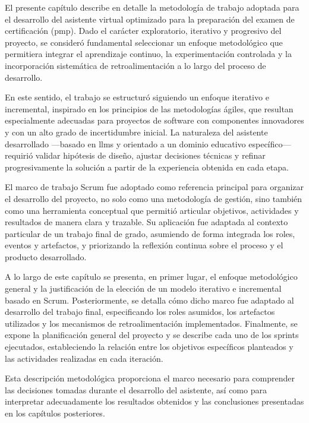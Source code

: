 El presente capítulo describe en detalle la metodología de trabajo adoptada para el desarrollo del asistente virtual optimizado para la preparación del examen de certificación (\gls{pmp}). Dado el carácter exploratorio, iterativo y progresivo del proyecto, se consideró fundamental seleccionar un enfoque metodológico que permitiera integrar el aprendizaje continuo, la experimentación controlada y la incorporación sistemática de retroalimentación a lo largo del proceso de desarrollo.

En este sentido, el trabajo se estructuró siguiendo un enfoque iterativo e incremental, inspirado en los principios de las metodologías ágiles, que resultan especialmente adecuadas para proyectos de software con componentes innovadores y con un alto grado de incertidumbre inicial. La naturaleza del asistente desarrollado —basado en \glspl{llm} y orientado a un dominio educativo específico— requirió validar hipótesis de diseño, ajustar decisiones técnicas y refinar progresivamente la solución a partir de la experiencia obtenida en cada etapa.

El marco de trabajo Scrum fue adoptado como referencia principal para organizar el desarrollo del proyecto, no solo como una metodología de gestión, sino también como una herramienta conceptual que permitió articular objetivos, actividades y resultados de manera clara y trazable. Su aplicación fue adaptada al contexto particular de un trabajo final de grado, asumiendo de forma integrada los roles, eventos y artefactos, y priorizando la reflexión continua sobre el proceso y el producto desarrollado.

A lo largo de este capítulo se presenta, en primer lugar, el enfoque metodológico general y la justificación de la elección de un modelo iterativo e incremental basado en Scrum. Posteriormente, se detalla cómo dicho marco fue adaptado al desarrollo del trabajo final, especificando los roles asumidos, los artefactos utilizados y los mecanismos de retroalimentación implementados. Finalmente, se expone la planificación general del proyecto y se describe cada uno de los sprints ejecutados, estableciendo la relación entre los objetivos específicos planteados y las actividades realizadas en cada iteración.

Esta descripción metodológica proporciona el marco necesario para comprender las decisiones tomadas durante el desarrollo del asistente, así como para interpretar adecuadamente los resultados obtenidos y las conclusiones presentadas en los capítulos posteriores.

